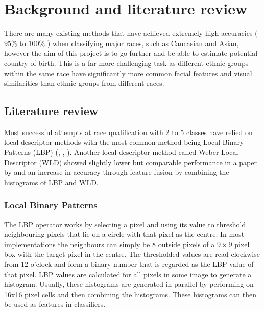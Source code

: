 \chapter{Background and literature review}
\label{background}
There are many existing methods that have achieved extremely high accuracies
($95\%$ to $100\%$ \citep{muhammadg}) when classifying major races, such as
Caucasian and Asian, however the aim of this project is to go further and be
able to estimate potential country of birth. This is a far more challenging
task as different ethnic groups within the same race have significantly more
common facial features and visual similarities than ethnic groups from
different races.

\section{Literature review}
Most successful attempts at race qualification with 2 to 5 classes have relied
on local descriptor methods with the most common method being Local Binary
Patterns (LBP) (\citep{muhammadg}, \citep{yangLBP}, \citep{zhang2D3D}). Another
local descriptor method called Weber Local Descriptor (WLD) showed slightly
lower but comparable performance in a paper by \citep{muhammadg} and an
increase in accuracy through feature fusion by combining the histograms of LBP
and WLD.  

\subsection{Local Binary Patterns}

The LBP operator works by selecting a pixel and using its value to threshold
neighbouring pixels that lie on a circle with that pixel as the centre. In most
implementations the neighbours can simply be 8 outside pixels of a $9 \times 9$ pixel
box with the target pixel in the centre.  The thresholded values are read
clockwise from 12 o’clock and form a binary number that is regarded as the LBP
value of that pixel. LBP values are calculated for all pixels in some image to
generate a histogram.  Usually, these histograms are generated in parallel by
performing on 16x16 pixel cells and then combining the histograms. These
histograms can then be used as features in classifiers.  


